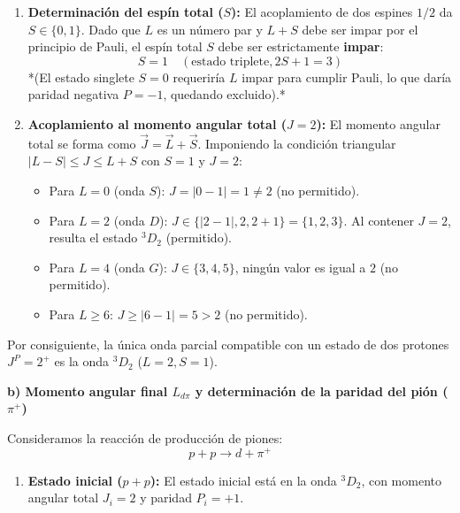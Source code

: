 \begin{problema}
\begin{enumerate}[label=\arabic*.]
    \item \textbf{Determinación del espín total ($S$):}
    El acoplamiento de dos espines $1/2$ da $S \in \{0, 1\}$. Dado que $L$ es un número par y $L + S$ debe ser impar por el principio de Pauli, el espín total $S$ debe ser estrictamente \textbf{impar}:
    \begin{equation*}
        S = 1 \quad (\text{estado triplete}, 2S+1 = 3)
    \end{equation*}
    *(El estado singlete $S = 0$ requeriría $L$ impar para cumplir Pauli, lo que daría paridad negativa $P = -1$, quedando excluido).*

    \item \textbf{Acoplamiento al momento angular total ($J = 2$):}
    El momento angular total se forma como $\vec{J} = \vec{L} + \vec{S}$. Imponiendo la condición triangular $|L - S| \le J \le L + S$ con $S = 1$ y $J = 2$:
    \begin{itemize}
        \item Para $L = 0$ (onda $S$): $J = |0 - 1| = 1 \neq 2$ (no permitido).
        \item Para $L = 2$ (onda $D$): $J \in \{|2-1|, 2, 2+1\} = \{1, 2, 3\}$. Al contener $J = 2$, resulta el estado \textbf{$^3D_2$} (permitido).
        \item Para $L = 4$ (onda $G$): $J \in \{3, 4, 5\}$, ningún valor es igual a $2$ (no permitido).
        \item Para $L \ge 6$: $J \ge |6 - 1| = 5 > 2$ (no permitido).
    \end{itemize}
\end{enumerate}

Por consiguiente, la única onda parcial compatible con un estado de dos protones $J^P = 2^+$ es la onda \textbf{$^3D_2$} ($L=2, S=1$).

\vspace{0.3cm}
\textbf{b) Momento angular final $L_{d\pi}$ y determinación de la paridad del pión ($\pi^+$)}

Consideramos la reacción de producción de piones:
\begin{equation*}
    p + p \longrightarrow d + \pi^+
\end{equation*}

\begin{enumerate}[label=\arabic*.]
    \item \textbf{Estado inicial ($p+p$):}
    El estado inicial está en la onda $^3D_2$, con momento angular total $J_i = 2$ y paridad $P_i = +1$.


\end{enumerate}
\end{problema}
